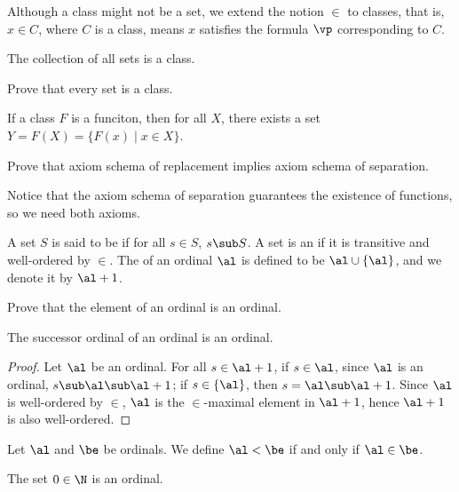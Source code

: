 \documentclass[10pt]{article}
\begin{document}
\begin{remark}
    Although a class might not be a set, we extend the notion $\in$ to classes, that is, $x\in C$, where $C$ is a class, means $x$ satisfies the formula $\vp$ corresponding to $C$.
\end{remark}
\begin{example}
    The collection of all sets is a class.
\end{example}
\begin{problem}
    Prove that every set is a class.
\end{problem}
\begin{Axiom schema of replacement}
    If a class $F$ is a funciton, then for all $X$, there exists a set $Y=F(X)=\{F(x)\mid x\in X\}$.
\end{Axiom schema of replacement}
\begin{problem}
    Prove that axiom schema of replacement implies axiom schema of separation.
\end{problem}
\par
Notice that the axiom schema of separation guarantees the existence of functions, so we need both axioms.
\begin{definition}
    A set $S$ is said to be  if for all $s\in S$, $s\sub S$. A set is an  if it is transitive and well-ordered by $\in$. The  of an ordinal $\al$ is defined to be $\al\cup\{\al\}$, and we denote it by $\al+1$. 
\end{definition}
\begin{problem}
    Prove that the element of an ordinal is an ordinal.
\end{problem}
\begin{proposition}
    The successor ordinal of an ordinal is an ordinal.
\end{proposition}
\begin{proof}
    Let $\al$ be an ordinal. For all $s\in\al+1$, if $s\in\al$, since $\al$ is an ordinal, $s\sub\al\sub\al+1$; if $s\in\{\al\}$, then $s=\al\sub\al+1$. Since $\al$ is well-ordered by $\in$, $\al$ is the $\in$-maximal element in $\al+1$, hence $\al+1$ is also well-ordered.
\end{proof}
\par
Let $\al$ and $\be$ be ordinals. We define $\al<\be$ if and only if $\al\in\be$.
\begin{example}
    The set $0\in\N$ is an ordinal.
\end{example}
\end{document}
